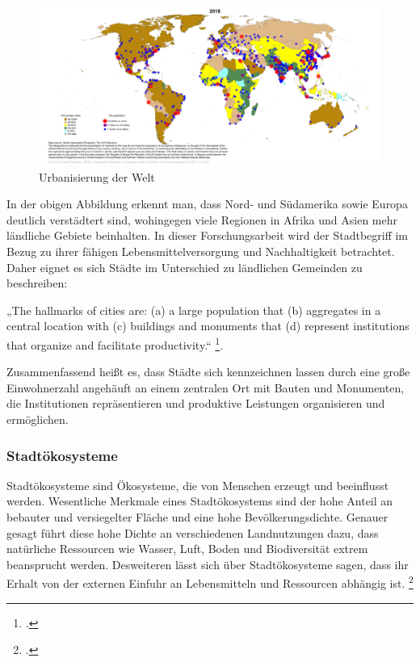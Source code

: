 \documentclass{scrartcl}
\begin{document}
\begin{figure}[htbp]
\centering
\hspace*{-3cm}   
\includegraphics[width=20cm]{image_folder/CityPop_Urban.png}
\caption{Urbanisierung der Welt}
\label{figUrban}
\end{figure}

\FloatBarrier
In der obigen Abbildung erkennt man, dass Nord- und Südamerika sowie Europa deutlich verstädtert sind, wohingegen viele Regionen in Afrika und Asien mehr ländliche Gebiete beinhalten. In dieser Forschungsarbeit wird der Stadtbegriff im Bezug zu ihrer fähigen Lebensmittelversorgung und Nachhaltigkeit betrachtet. Daher eignet es sich Städte im Unterschied zu ländlichen Gemeinden zu beschreiben: 

\begin{displayquote} 
„The hallmarks of cities are: (a) a large population that (b) aggregates in a central location with (c) buildings and monuments that (d) represent institutions that organize and facilitate productivity.“ \footcite[S.16]{Elmqvist2013}. 
\end{displayquote}  Zusammenfassend heißt es, dass Städte sich kennzeichnen lassen durch eine große Einwohnerzahl angehäuft an einem zentralen Ort mit Bauten und Monumenten, die Institutionen repräsentieren und produktive Leistungen organisieren und ermöglichen.

\subsubsection{Stadtökosysteme}
Stadtökosysteme sind Ökosysteme, die von Menschen erzeugt und beeinflusst werden. Wesentliche Merkmale eines Stadtökosystems sind der hohe Anteil an bebauter und versiegelter Fläche und eine hohe Bevölkerungsdichte. Genauer gesagt führt diese hohe Dichte an verschiedenen Landnutzungen dazu, dass natürliche Ressourcen wie Wasser, Luft, Boden und Biodiversität extrem beansprucht werden. Desweiteren lässt sich über Stadtökosysteme sagen, dass ihr Erhalt von der externen Einfuhr an Lebensmitteln und Ressourcen abhängig ist.  \footcite[S.61]{Breuste2016Stadtokosysteme}
\end{document}
